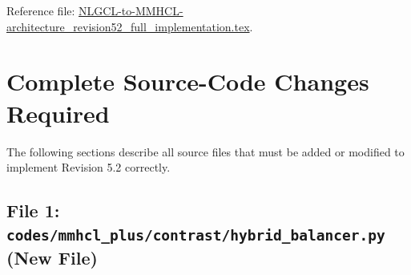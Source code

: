 \documentclass[11pt,a4paper]{article}
\begin{document}
Reference file: \href{https://ppl-ai-file-upload.s3.amazonaws.com/web/direct-files/attachments/72093286/cea73928-4569-4a29-96ff-0184e58a433e/NLGCL-to-MMHCL-architecture_revision52_full_implementation.tex}{NLGCL-to-MMHCL-architecture\_revision52\_full\_implementation.tex}.

\section{Complete Source-Code Changes Required}
The following sections describe all source files that must be added or modified to implement Revision 5.2 correctly.

\subsection{File 1: \texttt{codes/mmhcl\_plus/contrast/hybrid\_balancer.py} (New File)}
\end{document}
